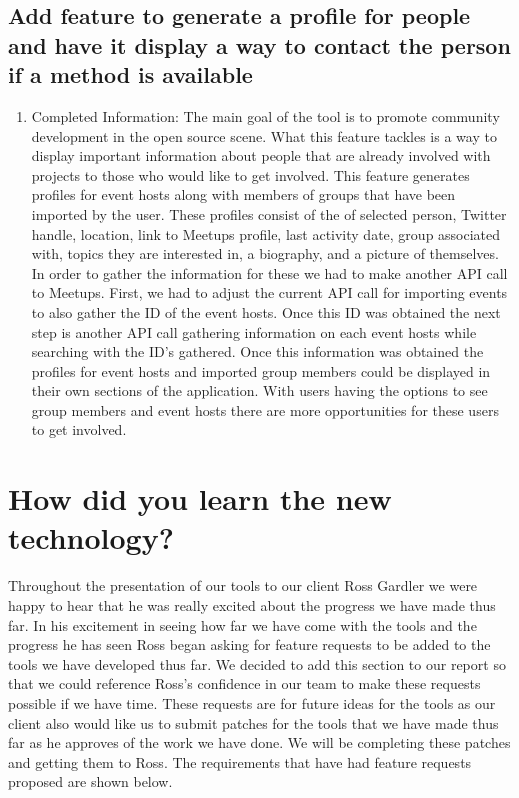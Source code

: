\documentclass[draftclsnofoot,10pt,onecolumn]{IEEEtran} %
\begin{document}
\subsection{Add feature to generate a profile for people and have it display a way to contact the person if a method is available}
\begin{enumerate}

  \item Completed Information: The main goal of the tool is to promote community
    development in the open source scene. What this feature tackles is a way to display
    important information about people that are already involved with projects to those
    who would like to get involved. This feature generates profiles for event hosts along
    with members of groups that have been imported by the user. These profiles consist of 
    the of selected person, Twitter handle, location, link to Meetups profile, last activity date, 
    group associated with, topics they are interested in, a biography, and a picture of themselves.
    In order to gather the information for these we had to make another API call to Meetups. First,
    we had to adjust the current API call for importing events to also gather the ID of the event hosts.
    Once this ID was obtained the next step is another API call gathering information on each event hosts
    while searching with the ID's gathered. Once this information was obtained the profiles for event
    hosts and imported group members could be displayed in their own sections of the application.
    With users having the options to see group members and event hosts there are more opportunities
    for these users to get involved.

\end{enumerate}
\fi


\section{How did you learn the new technology?}
Throughout the presentation of our tools to our client Ross Gardler we were happy to hear that he was really excited about the progress we have made thus far.
In his excitement in seeing how far we have come with the tools and the progress he has seen
Ross began asking for feature requests to be added to the tools we have developed thus far.
We decided to add this section to our report so that we could reference Ross's confidence in our team to make these requests possible if we have time.
These requests are for future ideas for the tools as our client also would like us to submit patches for the tools
that we have made thus far as he approves of the work we have done. We will be completing these patches and getting them to Ross.
The requirements that have had feature requests proposed are shown below.
\end{document}
